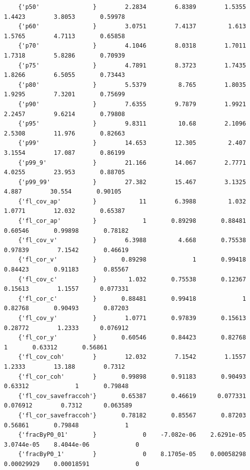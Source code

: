 \documentclass[
]{book}
\begin{document}
\begin{verbatim}
    {'p50'               }        2.2834        6.8389        1.5355        1.4423        3.8053       0.59978 
    {'p60'               }        3.0751        7.4137         1.613        1.5765        4.7113       0.65858 
    {'p70'               }        4.1046        8.0318        1.7011        1.7318        5.8286       0.70939 
    {'p75'               }        4.7891        8.3723        1.7435        1.8266        6.5055       0.73443 
    {'p80'               }        5.5379         8.765        1.8035        1.9295        7.3201       0.75699 
    {'p90'               }        7.6355        9.7879        1.9921        2.2457        9.6214       0.79808 
    {'p95'               }        9.8311         10.68        2.1096        2.5308        11.976       0.82663 
    {'p99'               }        14.653        12.305         2.407        3.1554        17.087       0.86199 
    {'p99_9'             }        21.166        14.067        2.7771        4.0255        23.953       0.88705 
    {'p99_99'            }        27.382        15.467        3.1325         4.887        30.554       0.90105 
    {'fl_cov_ap'         }            11        6.3988         1.032        1.0771        12.032       0.65387 
    {'fl_cor_ap'         }             1       0.89298       0.88481       0.60546       0.99898       0.78182 
    {'fl_cov_v'          }        6.3988         4.668       0.75538       0.97839        7.1542       0.46619 
    {'fl_cor_v'          }       0.89298             1       0.99418       0.84423       0.91183       0.85567 
    {'fl_cov_c'          }         1.032       0.75538       0.12367       0.15613        1.1557      0.077331 
    {'fl_cor_c'          }       0.88481       0.99418             1       0.82768       0.90493       0.87203 
    {'fl_cov_y'          }        1.0771       0.97839       0.15613       0.28772        1.2333      0.076912 
    {'fl_cor_y'          }       0.60546       0.84423       0.82768             1       0.63312       0.56861 
    {'fl_cov_coh'        }        12.032        7.1542        1.1557        1.2333        13.188        0.7312 
    {'fl_cor_coh'        }       0.99898       0.91183       0.90493       0.63312             1       0.79848 
    {'fl_cov_savefraccoh'}       0.65387       0.46619      0.077331      0.076912        0.7312      0.063589 
    {'fl_cor_savefraccoh'}       0.78182       0.85567       0.87203       0.56861       0.79848             1 
    {'fracByP0_01'       }             0    -7.082e-06    2.6291e-05    3.0744e-05    8.4044e-06             0 
    {'fracByP0_1'        }             0    8.1705e-05    0.00058298    0.00029929    0.00018591             0 

\end{verbatim}
\end{document}
